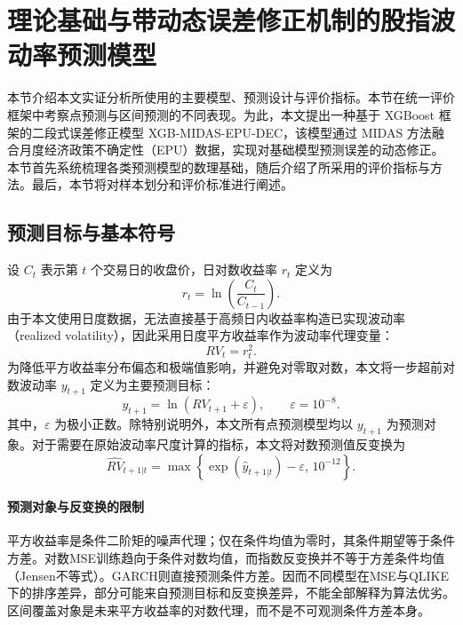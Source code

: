 \section{理论基础与带动态误差修正机制的股指波动率预测模型}

本节介绍本文实证分析所使用的主要模型、预测设计与评价指标。本节在统一评价框架中考察点预测与区间预测的不同表现。为此，本文提出一种基于 XGBoost 框架的二段式误差修正模型 XGB-MIDAS-EPU-DEC，该模型通过 MIDAS 方法融合月度经济政策不确定性（EPU）数据，实现对基础模型预测误差的动态修正。本节首先系统梳理各类预测模型的数理基础，随后介绍了所采用的评价指标与方法。最后，本节将对样本划分和评价标准进行阐述。

\subsection{预测目标与基本符号}

设 \(C_t\) 表示第 \(t\) 个交易日的收盘价，日对数收益率 $r_t$ 定义为
\begin{equation}
	r_t=\ln\left(\frac{C_t}{C_{t-1}}\right).
\end{equation}
由于本文使用日度数据，无法直接基于高频日内收益率构造已实现波动率（realized volatility），因此采用日度平方收益率作为波动率代理变量：
\begin{equation}
	RV_t=r_t^2.
\end{equation}
为降低平方收益率分布偏态和极端值影响，并避免对零取对数，本文将一步超前对数波动率 $y_{t+1}$ 定义为主要预测目标：
\begin{equation}
	y_{t+1}=\ln(RV_{t+1}+\varepsilon),
	\qquad \varepsilon=10^{-8}.
\end{equation}
其中，\(\varepsilon\) 为极小正数。除特别说明外，本文所有点预测模型均以 \(y_{t+1}\) 为预测对象。对于需要在原始波动率尺度计算的指标，本文将对数预测值反变换为
\begin{equation}
	\widehat{RV}_{t+1|t}
	=
	\max\left\{
	\exp(\hat{y}_{t+1|t})-\varepsilon,\,
	10^{-12}
	\right\}.
\end{equation}

\paragraph{预测对象与反变换的限制}
平方收益率是条件二阶矩的噪声代理；仅在条件均值为零时，其条件期望等于条件方差。对数MSE训练趋向于条件对数均值，而指数反变换并不等于方差条件均值（Jensen不等式）。GARCH则直接预测条件方差。因而不同模型在MSE与QLIKE下的排序差异，部分可能来自预测目标和反变换差异，不能全部解释为算法优劣。区间覆盖对象是未来平方收益率的对数代理，而不是不可观测条件方差本身。\par

